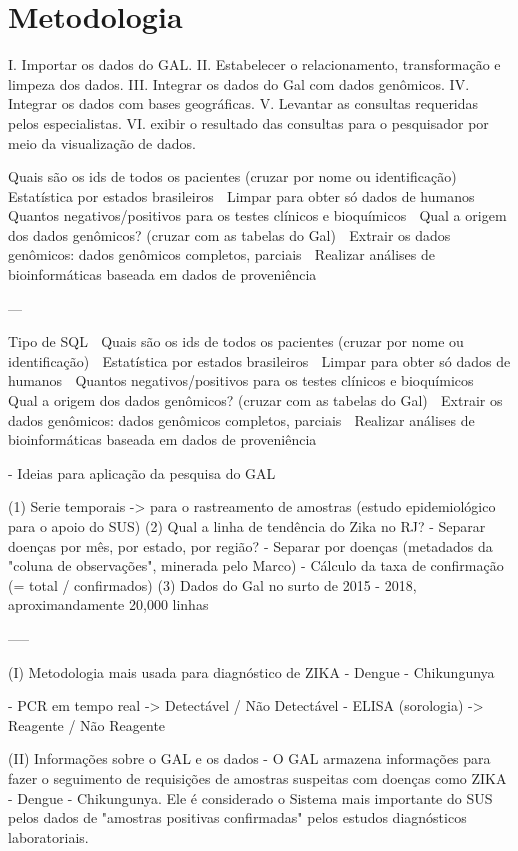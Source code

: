 \chapter{Metodologia}

I.	Importar os dados do GAL.
II.	Estabelecer o relacionamento, transformação e limpeza dos dados.
III.	Integrar os dados do Gal com dados genômicos.
IV.	Integrar os dados com bases geográficas.
V.	Levantar as consultas requeridas pelos especialistas.
VI.	exibir o resultado das consultas para o pesquisador por meio da visualização de dados.


Quais são os ids de todos os pacientes (cruzar por nome ou identificação)
	Estatística por estados brasileiros
	Limpar para obter só dados de humanos
	Quantos negativos/positivos para os testes clínicos e bioquímicos
	Qual a origem dos dados genômicos? (cruzar com as tabelas do Gal)
	Extrair os dados genômicos: dados genômicos completos, parciais
	Realizar análises de bioinformáticas baseada em dados de proveniência


---

Tipo de SQL		Quais são os ids de todos os pacientes (cruzar por nome ou identificação)
	Estatística por estados brasileiros
	Limpar para obter só dados de humanos
	Quantos negativos/positivos para os testes clínicos e bioquímicos
	Qual a origem dos dados genômicos? (cruzar com as tabelas do Gal)
	Extrair os dados genômicos: dados genômicos completos, parciais
	Realizar análises de bioinformáticas baseada em dados de proveniência


- Ideias para aplicação da pesquisa do GAL

	(1) Serie temporais -> para o rastreamento de amostras (estudo epidemiológico para o apoio do SUS)
	(2) Qual a linha de tendência do Zika no RJ? 
		- Separar doenças por mês, por estado, por região?
		- Separar por doenças (metadados da "coluna de observações", minerada pelo Marco)
		- Cálculo da taxa de confirmação (= total / confirmados)
	(3) Dados do Gal no surto de 2015 - 2018, aproximandamente 20,000 linhas

	-----
	
	
(I) Metodologia mais usada para diagnóstico de ZIKA - Dengue - Chikungunya

- PCR em tempo real -> Detectável / Não Detectável
- ELISA (sorologia) -> Reagente / Não Reagente

(II) Informações sobre o GAL e os dados
- O GAL armazena informações para fazer o seguimento de requisições de amostras suspeitas com doenças como ZIKA - Dengue - Chikungunya. Ele é considerado o Sistema mais importante do SUS pelos dados de "amostras positivas confirmadas" pelos estudos diagnósticos laboratoriais.

